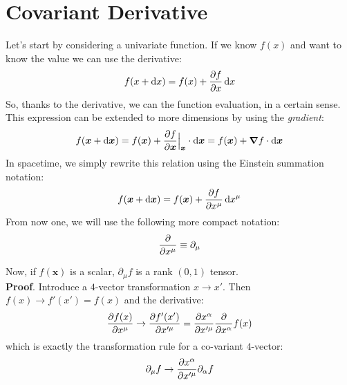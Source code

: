 \documentclass[../template.tex]{subfiles}
\begin{document}
\section{Covariant Derivative}
Let's start by considering a univariate function. If we know $f(x)$ and want to know the value  we can use the derivative:
\begin{align*}
    f(x+ \dd{x}) = f(x) + \pdv{f}{x} \dd{x}
\end{align*} 
So, thanks to the derivative, we can  the function evaluation, in a certain sense.\\
This expression can be extended to more dimensions by using the \textit{gradient}: 
\begin{align*}
    f(\bm{x} + \dd{\bm{x}}) = f(\bm{x}) + \pdv{f}{\bm{x}}\Big|_{\bm{x}} \cdot \dd{\bm{x}} = f(\bm{x}) + \bm{\nabla}f \cdot \dd{\bm{x}}
\end{align*}
In spacetime, we simply rewrite this relation using the Einstein summation notation:
\begin{align}
    f(\bm{x} + \dd{\bm{x}}) = f(\bm{x}) + \pdv{f}{x^{\mu}} \dd{x^\mu}
    \label{eqn:move-function}
\end{align}
From now one, we will use the following more compact notation:
\begin{align*}
    \pdv{x^\mu} \equiv \partial_\mu
\end{align*}

Now, if $f(\bm{x})$ is a scalar, $\partial_\mu f$ is a rank $(0,1)$ tensor.\\
\textbf{Proof}. Introduce a $4$-vector transformation $x \to x'$. Then $f(x) \to f'(x') = f(x)$ and the derivative:
\begin{align*}
    \pdv{f(x)}{x^\mu} \to \pdv{f'(x')}{x'^\mu} = \pdv{x^\alpha}{x'^\mu} \pdv{x^\alpha}f(x)
\end{align*}       
which is exactly the transformation rule for a co-variant $4$-vector:
\begin{align*}
    \partial_\mu f \to \pdv{x^\alpha}{x'^\mu} \partial_\alpha f
\end{align*} 
\end{document}
